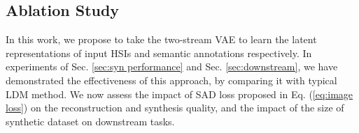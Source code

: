 

\subsection{Ablation Study}

In this work, we propose to take the two-stream VAE to learn the latent representations of input HSIs and semantic annotations respectively. In experiments of Sec. \ref{sec:syn performance} and Sec. \ref{sec:downstream}, we have demonstrated the effectiveness of this approach, by comparing it with typical LDM method. We now assess the impact of SAD loss proposed in Eq. (\ref{eq:image loss}) on the reconstruction and synthesis quality, and the impact of the size of synthetic dataset on downstream tasks.

